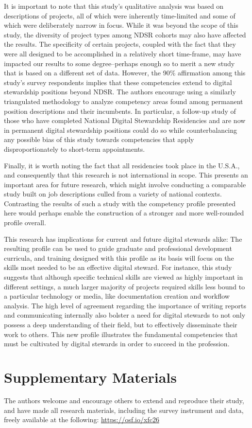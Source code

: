 \documentclass{acm_proc_article-sp}
\begin{document}
It is important to note that this study's qualitative analysis was based on descriptions of projects, all of which were inherently time-limited and some of which were deliberately narrow in focus. While it was beyond the scope of this study, the diversity of project types among NDSR cohorts may also have affected the results. The specificity of certain projects, coupled with the fact that they were all designed to be accomplished in a relatively short time-frame, may have impacted our results to some degree--perhaps enough so to merit a new study that is based on a different set of data. However, the 90\% affirmation among this study's survey respondents implies that these competencies extend to digital stewardship positions beyond NDSR. The authors encourage using a similarly triangulated methodology to analyze competency areas found among permanent position descriptions and their incumbents. In particular, a follow-up study of those who have completed National Digital Stewardship Residencies and are now in permanent digital stewardship positions could do so while counterbalancing any possible bias of this study towards competencies that apply disproportionately to short-term appointments. 

Finally, it is worth noting the fact that all residencies took place in the U.S.A., and consequently that this research is not international in scope. This presents an important area for future research, which might involve conducting a comparable study built on job descriptions culled from a variety of national contexts. Contrasting the results of such a study with the competency profile presented here would perhaps enable the construction of a stronger and more well-rounded profile overall.

This research has implications for current and future digital stewards alike: The resulting profile can be used to guide graduate and professional development curricula, and training designed with this profile as its basis will focus on the skills most needed to be an effective digital steward. For instance, this study suggests that although specific technical skills are viewed as highly important in different settings, a much larger majority of projects required skills less bound to a particular technology or media, like documentation creation and workflow analysis. The high level of agreement regarding the importance of writing reports and communicating internally also bolster a need for digital stewards to not only possess a deep understanding of their field, but to effectively disseminate their work to others. This new profile illustrates the fundamental competencies that must be cultivated by digital stewards in order to succeed in the profession. 

\section{Supplementary Materials}
The authors welcome and encourage others to extend and reproduce their study, and have made all research materials, including the survey instrument and data, freely available at the following: \url{https://osf.io/xfc26}

 


\end{document}
